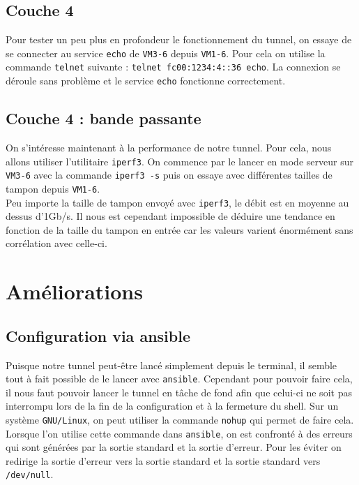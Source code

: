 \documentclass[a4paper, 12pt]{article}
\begin{document}
\begin{spacing}{1.1}
    \subsection{Couche 4}

    Pour tester un peu plus en profondeur le fonctionnement du tunnel, on essaye
    de se connecter au service \verb+echo+ de \verb+VM3-6+ depuis \verb+VM1-6+.
    Pour cela on utilise la commande \verb+telnet+ suivante : 
    \verb+telnet fc00:1234:4::36 echo+. La connexion se déroule sans problème 
    et le service \verb+echo+ fonctionne correctement.

    \subsection{Couche 4 : bande passante}

    On s'intéresse maintenant à la performance de notre tunnel. Pour cela, nous 
    allons utiliser l'utilitaire \verb+iperf3+. On commence par le lancer en
    mode serveur sur \verb+VM3-6+ avec la commande \verb+iperf3 -s+ puis on essaye
    avec différentes tailles de tampon depuis \verb+VM1-6+. \\

    Peu importe la taille de tampon envoyé avec \verb+iperf3+, le débit est en 
    moyenne au dessus d'1Gb/s. Il nous est cependant impossible de déduire 
    une tendance en fonction de la taille du tampon en entrée car les valeurs 
    varient énormément sans corrélation avec celle-ci.

    \section{Améliorations}

    \subsection{Configuration via ansible}

    Puisque notre tunnel peut-être lancé simplement depuis le terminal, il 
    semble tout à fait possible de le lancer avec \verb+ansible+. Cependant pour
    pouvoir faire cela, il nous faut pouvoir lancer le tunnel en tâche de fond 
    afin que celui-ci ne soit pas interrompu lors de la fin de la configuration
    et à la fermeture du shell. Sur un système \verb+GNU/Linux+, on peut 
    utiliser la commande \verb+nohup+ qui permet de faire cela. \\

    Lorsque l'on utilise cette commande dans \verb+ansible+, on est confronté à 
    des erreurs qui sont générées par la sortie standard et la sortie d'erreur.
    Pour les éviter on redirige la sortie d'erreur vers la sortie standard et 
    la sortie standard vers \verb+/dev/null+. \\


\end{spacing}
\end{document}
